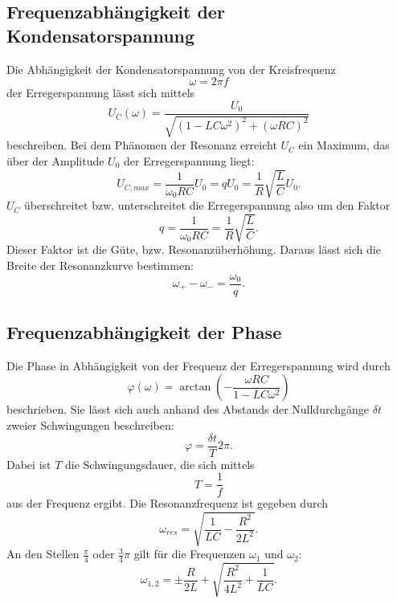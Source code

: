 \subsection{Frequenzabhängigkeit der Kondensatorspannung}
Die Abhängigkeit der Kondensatorspannung von der Kreisfrequenz
\begin{equation*}
    \omega = 2\pi f
\end{equation*}
der Erregerspannung lässt sich mittels 
\begin{equation}
    U_{C}(\omega)= \frac{U_{0}}{\sqrt{(1-LC\omega^{2})^{2} + (\omega R C)^{2}}}
\end{equation}
beschreiben.
Bei dem Phänomen der Resonanz erreicht $U_{C}$ ein Maximum, das über der Amplitude $U_{0}$ der Erregerspannung liegt:
\begin{equation}
    U_{C, max} = \frac{1}{\omega_{0}RC} U_{0} = q U_{0} = \frac{1}{R} \sqrt{\frac{L}{C}} U_{0}.
    \label{eqn:ucmax}
\end{equation}
$U_{C}$ überschreitet bzw. unterschreitet die Erregerspannung also um den Faktor 
\begin{equation}
    q = \frac{1}{\omega_{0}RC} = \frac{1}{R} \sqrt{\frac{L}{C}}.
    \label{eqn:q}
\end{equation}
Dieser Faktor ist die Güte, bzw. Resonanzüberhöhung.
Daraus lässt sich die Breite der Resonanzkurve bestimmen:
\begin{equation}
    \omega_{+} - \omega_{-} = \frac{\omega_{0}}{q}.
    \label{eqn:breite}
\end{equation}

\subsection{Frequenzabhängigkeit der Phase}
Die Phase in Abhängigkeit von der Frequenz der Erregerspannung wird durch
\begin{equation*}
    \varphi(\omega) = \arctan(-\frac{\omega RC}{1-LC\omega^2})
\end{equation*}
beschrieben.
Sie lässt sich auch anhand des Abstands der Nulldurchgänge $\delta t$ zweier Schwingungen beschreiben:
\begin{equation}
    \varphi = \frac{\delta t}{T} 2 \pi.
    \label{eqn:phi}
\end{equation}
Dabei ist $T$ die Schwingungsdauer, die sich mittels
\begin{equation*}
    T = \frac{1}{f}
\end{equation*}
aus der Frequenz ergibt.
Die Resonanzfrequenz ist gegeben durch
\begin{equation}
    \omega_{res} = \sqrt{\frac{1}{LC} - \frac{R^2}{2L^2}}.
    \label{eqn:omega_res}
\end{equation}
An den Stellen $\frac{\pi}{4}$ oder $\frac{3}{4} \pi$ gilt für die Frequenzen $\omega_{1}$
und $\omega_{2}$:
\begin{equation}
    \omega_{1,2} = \pm \frac{R}{2L} + \sqrt{\frac{R^2}{4L^2} + \frac{1}{LC}}.
    \label{eqn:omega_12}
\end{equation}

